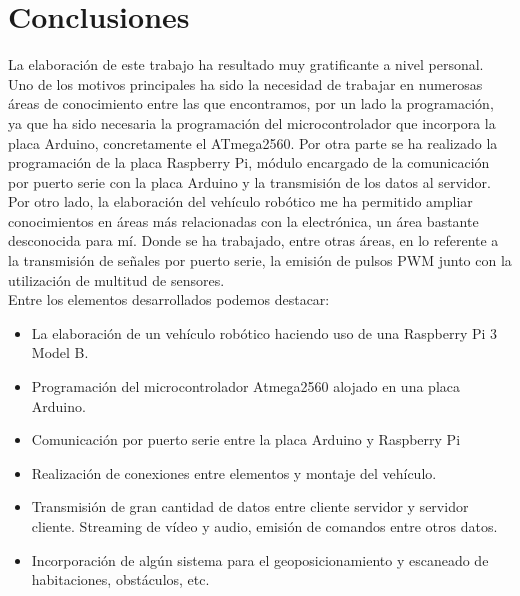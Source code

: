 

\newpage

\chapter{Conclusiones}
\label{chap:conclusiones}

La elaboración de este trabajo ha resultado muy gratificante a nivel personal. Uno de los motivos principales ha sido la necesidad de trabajar en numerosas áreas de 
conocimiento entre las que encontramos, por un lado la programación, ya que ha sido necesaria la programación del microcontrolador que incorpora la placa Arduino, 
concretamente el ATmega2560. Por otra parte se ha realizado la programación de la placa Raspberry Pi, módulo encargado de la comunicación por puerto serie con la placa Arduino y la 
transmisión de los datos al servidor.\\

Por otro lado, la elaboración del vehículo robótico me ha permitido ampliar conocimientos en áreas más relacionadas con la electrónica, un área bastante desconocida para mí. 
Donde se ha trabajado, entre otras áreas, en lo referente a la transmisión de señales por puerto serie, la emisión de pulsos PWM junto con la utilización de multitud de sensores.\\

Entre los elementos desarrollados podemos destacar:\\

\begin{itemize}
 \item La elaboración de un vehículo robótico haciendo uso de una Raspberry Pi 3 Model B.
 \item Programación del microcontrolador Atmega2560 alojado en una placa Arduino.
 \item Comunicación por puerto serie entre la placa Arduino y Raspberry Pi
 \item Realización de conexiones entre elementos y montaje del vehículo.
 \item Transmisión de gran cantidad de datos entre cliente servidor y servidor cliente. Streaming de vídeo y audio, emisión de comandos entre otros datos.\\
 \item Incorporación de algún sistema para el geoposicionamiento y escaneado de habitaciones, obstáculos, etc.
\end{itemize}

